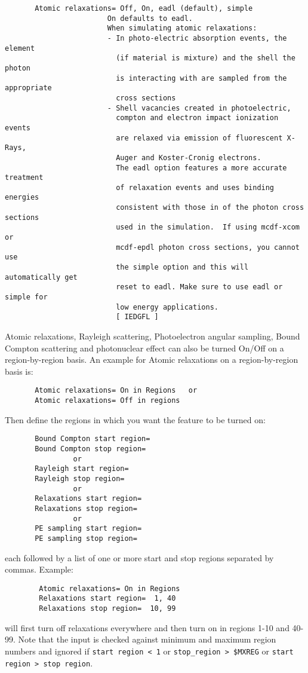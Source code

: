 \begin{verbatim}
       Atomic relaxations= Off, On, eadl (default), simple
                        On defaults to eadl.
                        When simulating atomic relaxations:
                        - In photo-electric absorption events, the element
                          (if material is mixture) and the shell the photon
                          is interacting with are sampled from the appropriate
                          cross sections
                        - Shell vacancies created in photoelectric,
                          compton and electron impact ionization events
                          are relaxed via emission of fluorescent X-Rays,
                          Auger and Koster-Cronig electrons.
                          The eadl option features a more accurate treatment
                          of relaxation events and uses binding energies
                          consistent with those in of the photon cross sections
                          used in the simulation.  If using mcdf-xcom or
                          mcdf-epdl photon cross sections, you cannot use
                          the simple option and this will automatically get
                          reset to eadl. Make sure to use eadl or simple for
                          low energy applications.
                          [ IEDGFL ]
\end{verbatim}

\noindent
Atomic relaxations, Rayleigh scattering, Photoelectron angular sampling,
Bound Compton scattering and photonuclear effect
can also be turned On/Off on a region-by-region basis. An example for
Atomic relaxations on a region-by-region basis is:

\begin{verbatim}
       Atomic relaxations= On in Regions   or
       Atomic relaxations= Off in regions
\end{verbatim}

Then define the regions in which you want
the feature to be turned on:

\begin{verbatim}
       Bound Compton start region=
       Bound Compton stop region=
                or
       Rayleigh start region=
       Rayleigh stop region=
                or
       Relaxations start region=
       Relaxations stop region=
                or
       PE sampling start region=
       PE sampling stop region=
\end{verbatim}
each followed by a list of one or more
start and stop regions separated by commas.
Example:
\begin{verbatim}
        Atomic relaxations= On in Regions
        Relaxations start region=  1, 40
        Relaxations stop region=  10, 99
\end{verbatim}
will first turn off relaxations everywhere and
then turn on in regions 1-10 and 40-99.
Note that the input is checked against minimum
and maximum region numbers and ignored if
\verb+start region < 1+ or \verb+stop_region > $MXREG+ or
\verb+start region > stop region+.

